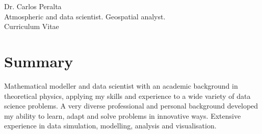 \documentclass[10pt]{article} %
\begin{document}
\begin{paracol}{2} %


\parbox[top][0.12\textheight][c]{\linewidth}{ %
	\vspace{-0.04\textheight} %
	\centering %
	{\sffamily\Huge Dr. Carlos Peralta}\\\medskip %
	{\sffamily Atmospheric and data scientist. Geospatial analyst.}\\\medskip %
	{\Huge\color{headings}\cvtextfont Curriculum Vitae}
}


\section{Summary}
Mathematical modeller and data scientist with an academic background in theoretical physics,
applying my skills and experience to a wide variety of data science problems.
A very diverse professional and personal background developed my ability to learn, adapt and solve problems in innovative ways.
Extensive experience in data simulation, modelling, analysis and visualisation. 

\medskip %



\end{paracol}
\end{document}
